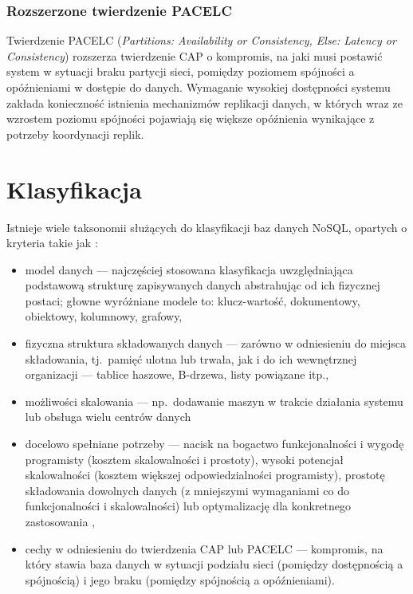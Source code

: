 \subsubsection*{Rozszerzone twierdzenie PACELC}

Twierdzenie PACELC (\textit{Partitions: Availability or Consistency, Else: Latency or Consistency}) rozszerza twierdzenie CAP o kompromis, na jaki musi postawić system w sytuacji braku partycji sieci, pomiędzy poziomem spójności a opóźnieniami w dostępie do danych. Wymaganie wysokiej dostępności systemu zakłada konieczność istnienia mechanizmów replikacji danych, w których wraz ze wzrostem poziomu spójności pojawiają się większe opóźnienia wynikające z potrzeby koordynacji replik.

\section{Klasyfikacja}

Istnieje wiele taksonomii służących do klasyfikacji baz danych NoSQL, opartych o kryteria takie jak \cite{nosql}:
\begin{itemize}
    \item model danych --- najczęściej stosowana klasyfikacja uwzględniająca podstawową strukturę zapisywanych danych abstrahując od ich fizycznej postaci; głowne wyróżniane modele to: klucz-wartość, dokumentowy, obiektowy, kolumnowy, grafowy,
    \item fizyczna struktura składowanych danych --- zarówno w odniesieniu do miejsca składowania,
        tj.\ pamięć ulotna lub trwała, jak i do ich wewnętrznej organizacji --- tablice haszowe, B-drzewa, listy powiązane itp.,
    \item możliwości skalowania --- np.\ dodawanie maszyn w trakcie działania systemu lub obsługa wielu centrów danych \cite{ell09a}
    \item docelowo spełniane potrzeby --- nacisk na bogactwo funkcjonalności i wygodę programisty (kosztem skalowalności i prostoty), wysoki potencjał skalowalności (kosztem większej odpowiedzialności programisty), prostotę składowania dowolnych danych (z mniejszymi wymaganiami co do funkcjonalności i skalowalności) lub optymalizację dla konkretnego zastosowania \cite{ham09},
    \item cechy w odniesieniu do twierdzenia CAP lub PACELC --- kompromis, na który stawia baza
        danych w sytuacji podziału sieci (pomiędzy dostępnością a spójnością) i jego braku (pomiędzy spójnością a opóźnieniami).
\end{itemize}


